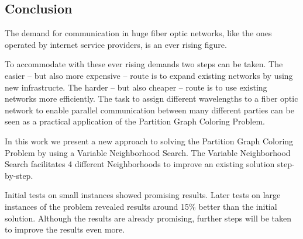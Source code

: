 \documentclass[paper=a4,fontsize=12pt]{scrartcl}
\begin{document}

\subsection{Conclusion}
The demand for communication in huge fiber optic networks, like the ones operated by internet service providers, is an ever rising figure.


To accommodate with these ever rising demands two steps can be taken. The easier -- but also more expensive -- route is to expand existing networks by using new infrastructe. The harder -- but also cheaper -- route is to use existing networks more efficiently. The task to assign different wavelengths to a fiber optic network to enable parallel communication between many different parties can be seen as a practical application of the Partition Graph Coloring Problem. 


In this work we present a new approach to solving the Partition Graph Coloring Problem by using a Variable Neighborhood Search. The Variable Neighborhood Search facilitates 4 different Neighborhoods to improve an existing solution step-by-step.


Initial tests on small instances showed promising results. Later tests on large instances of the problem revealed results around 15\% better than the initial solution. Although the results are already promising, further steps will be taken to improve the results even more.
\end{document}
